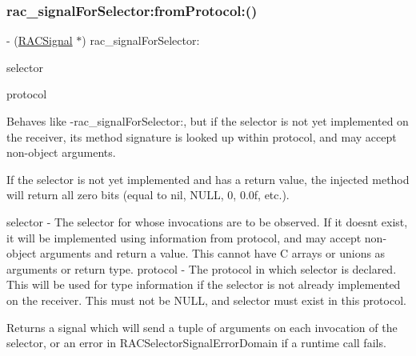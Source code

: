 \subsubsection{\texorpdfstring{rac\+\_\+signal\+For\+Selector\+:from\+Protocol\+:()}{rac\_signalForSelector:fromProtocol:()}\hspace{0.1cm}{\footnotesize\ttfamily [2/3]}}
{\footnotesize\ttfamily -\/ (\mbox{\hyperlink{interface_r_a_c_signal}{R\+A\+C\+Signal}} $\ast$) rac\+\_\+signal\+For\+Selector\+: \begin{DoxyParamCaption}\item[{(S\+EL)}]{selector }\item[{fromProtocol:(Protocol $\ast$)}]{protocol }\end{DoxyParamCaption}}

Behaves like -\/rac\+\_\+signal\+For\+Selector\+:, but if the selector is not yet implemented on the receiver, its method signature is looked up within {\ttfamily protocol}, and may accept non-\/object arguments.

If the selector is not yet implemented and has a return value, the injected method will return all zero bits (equal to {\ttfamily nil}, {\ttfamily N\+U\+LL}, 0, 0.\+0f, etc.).

selector -\/ The selector for whose invocations are to be observed. If it doesn\textquotesingle{}t exist, it will be implemented using information from {\ttfamily protocol}, and may accept non-\/object arguments and return a value. This cannot have C arrays or unions as arguments or return type. protocol -\/ The protocol in which {\ttfamily selector} is declared. This will be used for type information if the selector is not already implemented on the receiver. This must not be {\ttfamily N\+U\+LL}, and {\ttfamily selector} must exist in this protocol.

Returns a signal which will send a tuple of arguments on each invocation of the selector, or an error in R\+A\+C\+Selector\+Signal\+Error\+Domain if a runtime call fails. \mbox{\label{category_n_s_object_07_r_a_c_selector_signal_08_ac1bb0fd410309fd037ae60f81fc8d55b}} 
